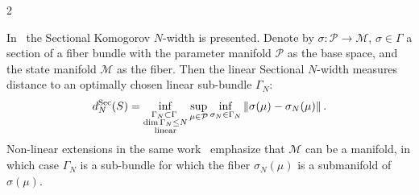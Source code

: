 \documentclass{article}
\newcommand{\M}{\mathcal{M}}                                %
\newcommand{\R}{\mathbb{R}}                                 %
\begin{document}
\begin{multicols}{2}

In~\cite{Engwer2025} the Sectional Komogorov $N$-width is presented. Denote by $\sigma:\mathcal{P}\rightarrow\M$, $\sigma \in \Gamma$ a section of a fiber bundle with the parameter manifold $\mathcal{P}$ as the base space, and the state manifold $\mathcal{M}$ as the fiber. Then the linear Sectional $N$-width measures distance to an optimally chosen linear sub-bundle $\Gamma_N$: 
\begin{align}\label{eq:sectional-N-width}
    d^{\textnormal{Sec}}_N(S) = \inf_{\substack{\Gamma_N \subset \Gamma\;\\ \dim \Gamma_N \leq N \\ \textnormal{linear}}} \sup_{\mu \in \mathcal{P}} \inf_{\sigma_N \in \Gamma_N} \| \sigma(\mu) - \sigma_N(\mu)\| \,.
\end{align}
Non-linear extensions in the same work~\cite{Engwer2025} emphasize that $\M$ can be a manifold, in which case $\Gamma_N$ is a sub-bundle for which the fiber $\sigma_N(\mu)$ is a submanifold of $\sigma(\mu)$. %


\end{multicols}
\end{document}
